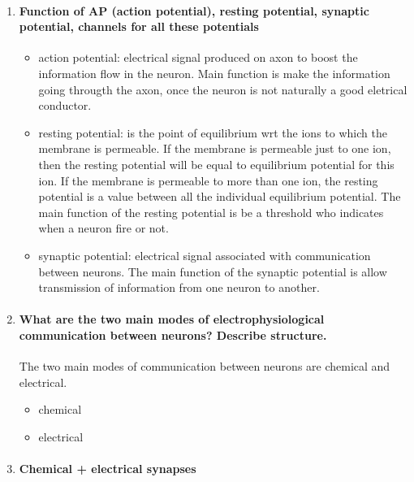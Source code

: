 \documentclass[12pt,article,oneside,a4paper]{memoir}
\begin{document}
\begin{enumerate}
\item \paragraph{Function of AP (action potential), resting potential, synaptic potential, channels for all these potentials}

\begin{itemize}
\item action potential: electrical signal produced on axon to boost the information flow in the neuron.	Main function is make the information going througth the axon, once the neuron is not naturally a good eletrical conductor.
\item resting potential: is the point of equilibrium wrt the ions to which the membrane is permeable. If the membrane is permeable just to one ion, then the resting potential will be equal to equilibrium potential for this ion. If the membrane is permeable to more than one ion, the resting potential is a value between all the individual equilibrium potential. The main function of the resting potential is be a threshold who indicates when a neuron fire or not.
\item synaptic potential: electrical signal associated with communication between neurons. The main function of the synaptic potential is allow transmission of information from one neuron to another.
\end{itemize}

\item \paragraph{What are the two main modes of electrophysiological communication between neurons? Describe structure.}
The two main modes of communication between neurons are chemical and electrical.
\begin{itemize}
\item chemical
\item electrical
\end{itemize}

\item \paragraph{Chemical + electrical synapses}
\end{enumerate}

\end{document}
